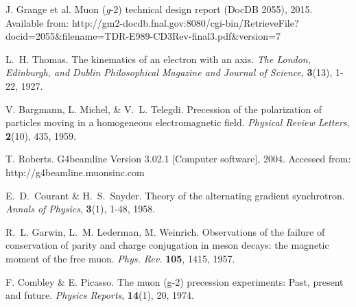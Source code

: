 \documentclass[12pt]{article}
\begin{document}
\begin{thebibliography}{99}

J. Grange et al. Muon (\textit{g}-2) technical design report (DocDB 2055), 2015. Available from: http://gm2-docdb.fnal.gov:8080/cgi-bin/RetrieveFile?docid=2055\&filename=TDR-E989-CD3Rev-final3.pdf\&version=7

L.~H. Thomas.
The kinematics of an electron with an axis.
{\em The London, Edinburgh, and Dublin Philosophical Magazine and Journal of Science},  \textbf{3}(13), 1-22, 1927. 

V. Bargmann, L. Michel, \& V.~L. Telegdi. Precession of the polarization of particles moving in a homogeneous electromagnetic field.
{\em Physical Review Letters}, \textbf{2}(10), 435, 1959.

T. Roberts. G4beamline Version 3.02.1 [Computer software], 2004. Accessed from: http://g4beamline.muonsinc.com

E.~D.~Courant \& H.~S.~Snyder. Theory of the alternating gradient synchrotron.
{\em Annals of Physics}, \textbf{3}(1), 1-48, 1958. 

R.~L. Garwin, L.~M. Lederman, M. Weinrich. Observations of the failure of conservation of parity and charge conjugation in meson decays: the magnetic moment of the free muon. \emph{Phys. Rev.} \textbf{105}, 1415, 1957.

F. Combley \& E. Picasso. The muon (g-2) precession experiments: Past, present and future. {\em Physics Reports}, \textbf{14}(1), 20, 1974. 

\end{thebibliography}


 
\end{document}
